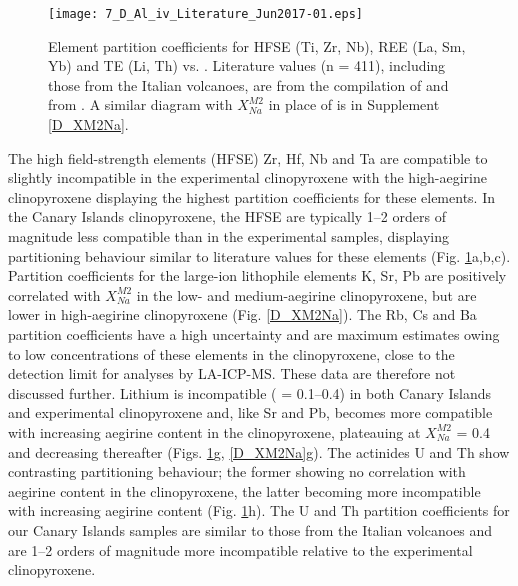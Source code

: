 \documentclass[review,authoryear,12pt]{elsarticle}
\begin{document}
        \begin{figure}[htp]
        \begin{center}
        \texttt{[image: 7\_D\_Al\_iv\_Literature\_Jun2017-01.eps]}
        \caption[Selected trace-element-partition coefficients vs. ]{Element partition coefficients for HFSE (Ti, Zr, Nb), REE (La, Sm, Yb) and TE (Li, Th) vs. . Literature values (n = 411), including those from the Italian volcanoes, are from the compilation of \citet{Bedard2014} and from \citet{Mollo2016}. A similar diagram with $X^{M2}_{Na}$ in place of  is in Supplement \ref{D_XM2Na}.}
        \label{7_Al_iv}
        \end{center}
        \end{figure}
The high field-strength elements (HFSE) Zr, Hf, Nb and Ta are compatible to slightly incompatible in the experimental clinopyroxene with the high-aegirine clinopyroxene displaying the highest partition coefficients for these elements. In the Canary Islands clinopyroxene, the HFSE are typically 1--2 orders of magnitude less compatible than in the experimental samples, displaying partitioning behaviour similar to literature values for these elements (Fig. \ref{7_Al_iv}a,b,c). 
	Partition coefficients for the large-ion lithophile elements K, Sr, Pb are positively correlated with $X_{Na}^{M2}$ in the low- and medium-aegirine clinopyroxene, but are lower in high-aegirine clinopyroxene (Fig. \ref{D_XM2Na}). The Rb, Cs and Ba partition coefficients have a high uncertainty and are maximum estimates owing to low concentrations of these elements in the clinopyroxene, close to the detection limit for analyses by LA-ICP-MS. These data are therefore not discussed further. 
	Lithium is incompatible ( = 0.1--0.4) in both Canary Islands and experimental clinopyroxene and, like Sr and Pb, becomes more compatible with increasing aegirine content in the clinopyroxene, plateauing at $X_{Na}^{M2}$ = 0.4 and decreasing thereafter (Figs. \ref{7_Al_iv}g, \ref{D_XM2Na}g). 
	The actinides U and Th show contrasting partitioning behaviour; the former showing no correlation with aegirine content in the clinopyroxene, the latter becoming more incompatible with increasing aegirine content (Fig. \ref{7_Al_iv}h). The U and Th partition coefficients for our Canary Islands samples are similar to those from the Italian volcanoes and are 1--2 orders of magnitude more incompatible relative to the experimental clinopyroxene.
\end{document}
